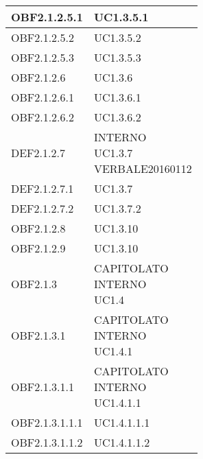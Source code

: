 \documentclass{scalatekids-article}
\begin{document}
\begin{longtable}[H]{|p{5.5cm}|p{5.5cm}|}
  \hline
  OBF2.1.2.5.1 & \multiLineCell[t]{UC1.3.5.1\\}\\
  \hline
  OBF2.1.2.5.2 & \multiLineCell[t]{UC1.3.5.2\\}\\
  \hline
  OBF2.1.2.5.3 & \multiLineCell[t]{UC1.3.5.3\\}\\
  \hline
  OBF2.1.2.6 & \multiLineCell[t]{UC1.3.6\\}\\
  \hline
  OBF2.1.2.6.1 & \multiLineCell[t]{UC1.3.6.1\\}\\
  \hline
  OBF2.1.2.6.2 & \multiLineCell[t]{UC1.3.6.2\\}\\
  \hline
  DEF2.1.2.7 & \multiLineCell[t]{INTERNO\\UC1.3.7\\VERBALE20160112\\}\\
  \hline
  DEF2.1.2.7.1 & \multiLineCell[t]{UC1.3.7\\}\\
  \hline
  DEF2.1.2.7.2 & \multiLineCell[t]{UC1.3.7.2\\}\\
  \hline
  OBF2.1.2.8 & \multiLineCell[t]{UC1.3.10\\}\\
  \hline
  OBF2.1.2.9 & \multiLineCell[t]{UC1.3.10\\}\\
  \hline
  OBF2.1.3 & \multiLineCell[t]{CAPITOLATO\\INTERNO\\UC1.4\\}\\
  \hline
  OBF2.1.3.1 & \multiLineCell[t]{CAPITOLATO\\INTERNO\\UC1.4.1\\}\\
  \hline
  OBF2.1.3.1.1 & \multiLineCell[t]{CAPITOLATO\\INTERNO\\UC1.4.1.1\\}\\
  \hline
  OBF2.1.3.1.1.1 & \multiLineCell[t]{UC1.4.1.1.1\\}\\
  \hline
  OBF2.1.3.1.1.2 & \multiLineCell[t]{UC1.4.1.1.2\\}\\

\end{longtable}
\end{document}
